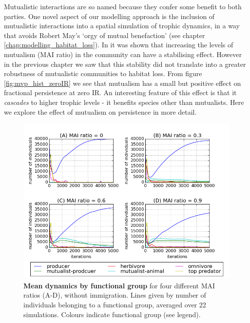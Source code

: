 Mutualistic interactions are so named because they confer some benefit to both parties. One novel aspect of our modelling approach is the inclusion of mutualistic interactions into a spatial simulation of trophic dynamics, in a way that avoids Robert May's `orgy of mutual benefaction' \cite{may1981patterns} (see chapter \ref{chap:modelling_habitat_loss}). In \cite{lurgi2015effects} it was shown that increasing the levels of mutualism (MAI ratio) in the community can have a stabilising effect. However in the previous chapter we saw that this stability did not translate into a greater robustness of mutualistic communities to habitat loss. From figure \ref{fig:mvp_hist_zeroIR} we see that mutualism has a small but positive effect on fractional persistence at zero IR. An interesting feature of this effect is that it \emph{cascades} to higher trophic levels - it benefits species other than mutualists. Here we explore the effect of mutualism on persistence in more detail.


\begin{figure}[h!]
	\centering
	\includegraphics[width=0.8\linewidth]{"figures/persistence/mean_trophic_dynamics"}
	\caption{\textbf{Mean dynamics by functional group} for four different MAI ratios (A-D), without immigration. Lines given by number of individuals belonging to a functional group, averaged over 22 simulations. Colours indicate functional group (see legend).}
	\label{fig:mvp_mean_dynamics}
\end{figure}


